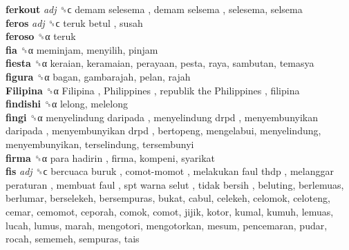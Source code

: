 \textbf{ferkout} \emph{adj}  ␝ϲ   demam selesema ,  demam selsema , selesema, selsema  \\
\textbf{feros} \emph{adj}  ␝ϲ   teruk betul , susah  \\
\textbf{feroso} ␝α  teruk  \\
\textbf{fia} ␝α  meminjam, menyilih, pinjam  \\
\textbf{fiesta} ␝α  keraian, keramaian, perayaan, pesta, raya, sambutan, temasya  \\
\textbf{figura} ␝α  bagan, gambarajah, pelan, rajah  \\
\textbf{Filipina} ␝α   Filipina ,  Philippines ,  republik the Philippines , filipina  \\
\textbf{findishi} ␝α  lelong, melelong  \\
\textbf{fingi} ␝α   menyelindung daripada ,  menyelindung drpd ,  menyembunyikan daripada ,  menyembunyikan drpd , bertopeng, mengelabui, menyelindung, menyembunyikan, terselindung, tersembunyi  \\
\textbf{firma} ␝α   para hadirin , firma, kompeni, syarikat  \\
\textbf{fis} \emph{adj}  ␝ϲ   bercuaca buruk ,  comot-momot ,  melakukan faul thdp ,  melanggar peraturan ,  membuat faul ,  spt warna selut ,  tidak bersih , beluting, berlemuas, berlumar, berselekeh, bersempuras, bukat, cabul, celekeh, celomok, celoteng, cemar, cemomot, ceporah, comok, comot, jijik, kotor, kumal, kumuh, lemuas, lucah, lumus, marah, mengotori, mengotorkan, mesum, pencemaran, pudar, rocah, sememeh, sempuras, tais  \\
